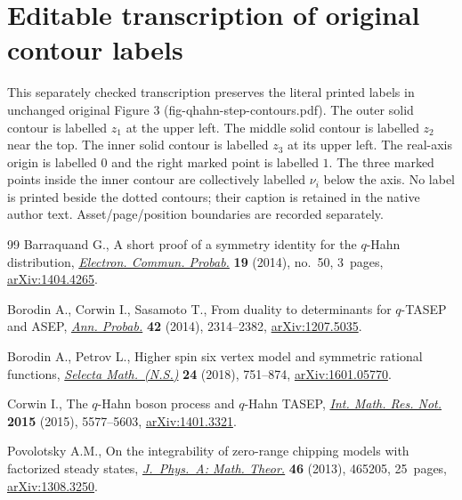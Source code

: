 \documentclass[11pt]{article}
\numberwithin{equation}{section}
\numberwithin{equation}{section}
\begin{document}
\section*{Editable transcription of original contour labels}
\noindent This separately checked transcription preserves the literal printed labels in unchanged original Figure 3 (fig-qhahn-step-contours.pdf). The outer solid contour is labelled $z_1$ at the upper left. The middle solid contour is labelled $z_2$ near the top. The inner solid contour is labelled $z_3$ at its upper left. The real-axis origin is labelled $0$ and the right marked point is labelled $1$. The three marked points inside the inner contour are collectively labelled $\nu_i$ below the axis. No label is printed beside the dotted contours; their caption is retained in the native author text. Asset/page/position boundaries are recorded separately.


\begin{thebibliography}{99}
Barraquand G., A short proof of a symmetry identity for the {$q$}-{H}ahn
 distribution, \href{https://doi.org/10.1214/ECP.v19-3674}{\textit{Electron. Commun. Probab.}} \textbf{19} (2014), no.~50,
 3~pages, \href{https://arxiv.org/abs/1404.4265}{arXiv:1404.4265}.

Borodin A., Corwin I., Sasamoto T., From duality to determinants for
 {$q$}-{TASEP} and {ASEP}, \href{https://doi.org/10.1214/13-AOP868}{\textit{Ann. Probab.}} \textbf{42} (2014),
 2314--2382, \href{https://arxiv.org/abs/1207.5035}{arXiv:1207.5035}.

Borodin A., Petrov L., Higher spin six vertex model and symmetric rational
 functions, \href{https://doi.org/10.1007/s00029-016-0301-7}{\textit{Selecta Math.~(N.S.)}} \textbf{24} (2018), 751--874,
 \href{https://arxiv.org/abs/1601.05770}{arXiv:1601.05770}.

Corwin I., The {$q$}-{H}ahn boson process and {$q$}-{H}ahn {TASEP},
 \href{https://doi.org/10.1093/imrn/rnu094}{\textit{Int. Math. Res. Not.}} \textbf{2015} (2015), 5577--5603,
 \href{https://arxiv.org/abs/1401.3321}{arXiv:1401.3321}.

Povolotsky A.M., On the integrability of zero-range chipping models with
 factorized steady states, \href{https://doi.org/10.1088/1751-8113/46/46/465205}{\textit{J.~Phys.~A: Math. Theor.}} \textbf{46}
 (2013), 465205, 25~pages, \href{https://arxiv.org/abs/1308.3250}{arXiv:1308.3250}.

\end{thebibliography}
\end{document}
